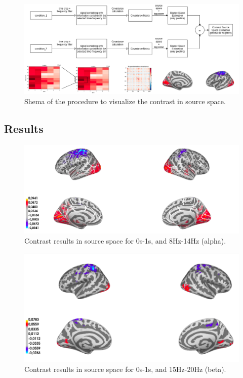 \begin{figure}[ht]
    \centering
    \includegraphics[width=15cm]{images_report/source/flow_source_contrasts.png}
    \caption[Shema of the procedure to visualize the contrast in source space.]%
    {Shema of the procedure to visualize the contrast in source space.}
    \label{flow_source_contrasts}
\end{figure}

\subsection{Results}


\begin{figure}[ht]
    \centering
    \includegraphics[width=15cm]{images_report/source/source_results_3d_cropped.png}
    \caption[Contrast results in the source space (alpha)]%
    {Contrast results in source space for 0s-1s, and 8Hz-14Hz (alpha).}
    \label{results_source_space_alpha}
\end{figure}

\begin{figure}[ht]
    \centering
    \includegraphics[width=13cm]{images_report/source/source_results_beta_1s.png}
    \caption[Results of the contrast in the source space.]%
    {Contrast results in source space for 0s-1s, and 15Hz-20Hz (beta).}
    \label{results_source_space_beta}
\end{figure}
 
